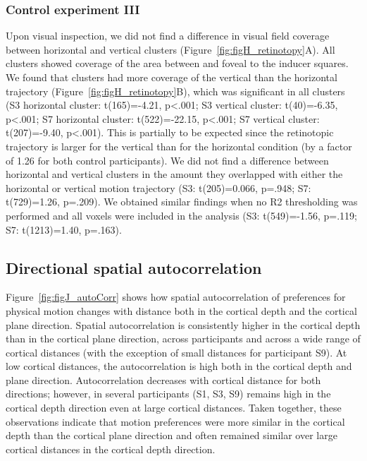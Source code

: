 \subsubsection{Control experiment III}
Upon visual inspection, we did not find a difference in visual field coverage between horizontal and vertical clusters (Figure~\ref{fig:figH_retinotopy}A). All clusters showed coverage of the area between and foveal to the inducer squares. We found that clusters had more coverage of the vertical than the horizontal trajectory (Figure~\ref{fig:figH_retinotopy}B), which was significant in all clusters (S3 horizontal cluster: t(165)=-4.21, p\textless.001; S3 vertical cluster: t(40)=-6.35, p\textless.001; S7 horizontal cluster: t(522)=-22.15, p\textless.001; S7 vertical cluster: t(207)=-9.40, p\textless.001). This is partially to be expected since the retinotopic trajectory is larger for the vertical than for the horizontal condition (by a factor of 1.26 for both control participants). We did not find a difference between horizontal and vertical clusters in the amount they overlapped with either the horizontal or vertical motion trajectory (S3: t(205)=0.066, p=.948; S7: t(729)=1.26, p=.209). We obtained similar findings when no R2 thresholding was performed and all voxels were included in the analysis (S3: t(549)=-1.56, p=.119; S7: t(1213)=1.40, p=.163).

\subsection{Directional spatial autocorrelation}
Figure~\ref{fig:figJ_autoCorr} shows how spatial autocorrelation of preferences for physical motion changes with distance both in the cortical depth and the cortical plane direction. Spatial autocorrelation is consistently higher in the cortical depth than in the cortical plane direction, across participants and across a wide range of cortical distances (with the exception of small distances for participant S9). At low cortical distances, the autocorrelation is high both in the cortical depth and plane direction. Autocorrelation decreases with cortical distance for both directions; however, in several participants (S1, S3, S9) remains high in the cortical depth direction even at large cortical distances. Taken together, these observations indicate that motion preferences were more similar in the cortical depth than the cortical plane direction and often remained similar over large cortical distances in the cortical depth direction.

